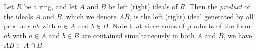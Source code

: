 \documentclass[12pt]{article}
\begin{document}
Let $R$ be a ring, and let $A$ and $B$ be left (right) ideals of $R$.  Then the {\it product} of the ideals $A$ and $B$, which we denote $AB$, is the left (right) ideal generated by all products $ab$ with $a\in A$ and $b\in B$.  Note that since sums of products of the form $ab$ with $a\in A$ and $b\in B$ are contained simultaneously in both $A$ and $B$, we have $AB\subset A\cap B$.
\end{document}
